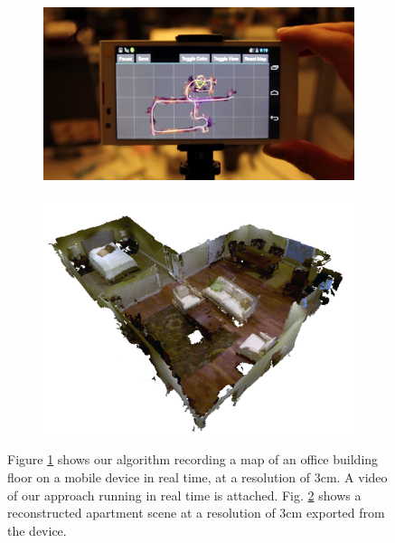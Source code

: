 \documentclass[10pt,twocolumn,letterpaper]{article}
\begin{document}
\maketitle
\begin{figure}
  \centering
    	 \begin{subfigure}{0.39\linewidth} \centering
		 \includegraphics[width=1\textwidth]{img/mapdevice}
		 \caption{}
		 \label{fig:map_device}
	 \end{subfigure}
      	 \begin{subfigure}{0.39\linewidth} \centering
		 \includegraphics[width=1\textwidth]{img/apartment_scene_color.png}
		 \caption{}
		 \label{fig:apartment_color}
	 \end{subfigure}
      \caption{Figure \ref{fig:map_device} shows our algorithm recording a map
      of an office building floor on a mobile device in real time, at a resolution of 3cm. A video of our approach running
  in real time is attached. Fig. \ref{fig:apartment_color} shows a
  reconstructed apartment scene at a resolution of 3cm exported from the
  device.}
  \label{fig:first_figure}
\end{figure}
\end{document}
